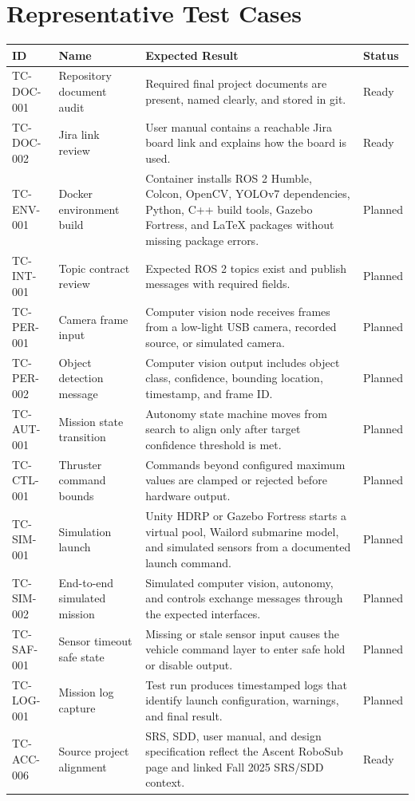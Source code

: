 \documentclass[12pt]{article}
\begin{document}
\section{Representative Test Cases}
\begin{longtable}{|p{}|p{}|p{}|p{}|}
\hline
\textbf{ID} & \textbf{Name} & \textbf{Expected Result} & \textbf{Status} \\
\hline
TC-DOC-001 & Repository document audit & Required final project documents are present, named clearly, and stored in git. & Ready \\
\hline
TC-DOC-002 & Jira link review & User manual contains a reachable Jira board link and explains how the board is used. & Ready \\
\hline
TC-ENV-001 & Docker environment build & Container installs ROS 2 Humble, Colcon, OpenCV, YOLOv7 dependencies, Python, C++ build tools, Gazebo Fortress, and LaTeX packages without missing package errors. & Planned \\
\hline
TC-INT-001 & Topic contract review & Expected ROS 2 topics exist and publish messages with required fields. & Planned \\
\hline
TC-PER-001 & Camera frame input & Computer vision node receives frames from a low-light USB camera, recorded source, or simulated camera. & Planned \\
\hline
TC-PER-002 & Object detection message & Computer vision output includes object class, confidence, bounding location, timestamp, and frame ID. & Planned \\
\hline
TC-AUT-001 & Mission state transition & Autonomy state machine moves from search to align only after target confidence threshold is met. & Planned \\
\hline
TC-CTL-001 & Thruster command bounds & Commands beyond configured maximum values are clamped or rejected before hardware output. & Planned \\
\hline
TC-SIM-001 & Simulation launch & Unity HDRP or Gazebo Fortress starts a virtual pool, Wailord submarine model, and simulated sensors from a documented launch command. & Planned \\
\hline
TC-SIM-002 & End-to-end simulated mission & Simulated computer vision, autonomy, and controls exchange messages through the expected interfaces. & Planned \\
\hline
TC-SAF-001 & Sensor timeout safe state & Missing or stale sensor input causes the vehicle command layer to enter safe hold or disable output. & Planned \\
\hline
TC-LOG-001 & Mission log capture & Test run produces timestamped logs that identify launch configuration, warnings, and final result. & Planned \\
\hline
TC-ACC-006 & Source project alignment & SRS, SDD, user manual, and design specification reflect the Ascent RoboSub page and linked Fall 2025 SRS/SDD context. & Ready \\
\hline
\end{longtable}
\end{document}
